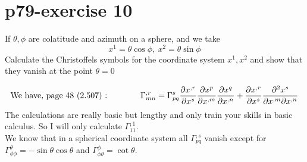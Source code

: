 \section{p79-exercise 10}
\begin{tcolorbox}
If $\theta, \phi$ are colatitude and azimuth on a sphere, and we take
$$x^1 = \theta \cos \phi, \ x^2=\theta\sin \phi$$
Calculate the Christoffels symbols for the coordinate system $x^1, x^2$ and show that they vanish at the point $\theta = 0$
\end{tcolorbox}
\begin{align}
\text{We have, page 48  (2.507) :}\quad\quad\quad\quad\Gamma_{mn}^{,r} =\Gamma_{pq}^{s}\pdv{x^{,r}}{x^s}\pdv{x^{p}}{x^{,m}}\pdv{x^{q}}{x^{,n}}+\pdv{x^{,r}}{x^s}\pdv{x^s}{x^{,m}}{x^{,n}}
\end{align}
The calculations are really basic but lengthy and only train your skills in basic calculus. So I will only calculate $\Gamma_{11}^{,1}$.\\
We know that in a spherical coordinate system all $\Gamma_{pq}^{,s}$ vanish except for $\Gamma_{\phi\phi}^{\theta} = -\sin\theta\cos\theta$ and $
\Gamma_{\phi\theta}^{\phi} =  \cot\theta$.

